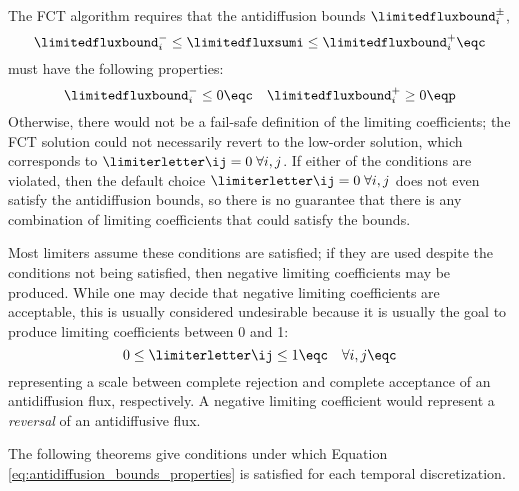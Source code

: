 The FCT algorithm requires that the antidiffusion bounds
$\limitedfluxbound_i^\pm$,
\[
  \limitedfluxbound_i^- \leq \limitedfluxsumi \leq \limitedfluxbound_i^+ \eqc
\]
must have the following properties:
\begin{equation}\label{eq:antidiffusion_bounds_properties}
  \limitedfluxbound_i^-\leq 0 \eqc \quad \limitedfluxbound_i^+\geq 0 \eqp
\end{equation}
Otherwise, there would not be a fail-safe definition of the limiting
coefficients; the FCT solution could not necessarily revert to the low-order
solution, which corresponds to $\limiterletter\ij = 0 \;\forall i,j$.
If either of the conditions are violated, then the default choice
$\limiterletter\ij = 0 \;\forall i,j$ does not even satisfy the
antidiffusion bounds, so there is no guarantee that there is any
combination of limiting coefficients that could satisfy the bounds.

Most limiters assume these conditions are satisfied; if they are
used despite the conditions not being satisfied, then negative limiting
coefficients may be produced.
While one may decide that negative limiting coefficients are acceptable,
this is usually considered undesirable because it is usually the goal
to produce limiting coefficients between 0 and 1:
\begin{equation}
  0 \leq \limiterletter\ij \leq 1 \eqc \quad \forall i,j \eqc
\end{equation}
representing a scale between complete rejection and complete acceptance
of an antidiffusion flux, respectively. A negative limiting coefficient
would represent a \emph{reversal} of an antidiffusive flux.

The following theorems give conditions under which Equation
\eqref{eq:antidiffusion_bounds_properties} is satisfied for each temporal
discretization.


